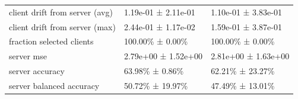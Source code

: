 \begin{tabular}{lll}
 client drift from server (avg)     & 1.19e-01 ± 2.11e-01 & 1.10e-01 ± 3.83e-01         \\
 client drift from server (max)     & 2.44e-01 ± 1.17e-02 & 1.59e-01 ± 3.87e-01         \\
 fraction selected clients          & 100.00\% ± 0.00\%     & 100.00\% ± 0.00\%             \\
 server mse                         & 2.79e+00 ± 1.52e+00 & 2.81e+00 ± 1.63e+00         \\
 server accuracy                    & 63.98\% ± 0.86\%      & 62.21\% ± 23.27\%             \\
 server balanced accuracy           & 50.72\% ± 19.97\%     & 47.49\% ± 13.01\%             \\
\hline
\end{tabular}